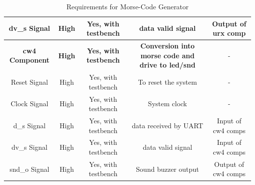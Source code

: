 \documentclass[12pt,a4paper, landscape]{article}
\begin{document}
\begin{table}[h!]
\begin{tabular}{|c||c|c|c|c|}
 \hline
 dv\_s Signal & High & Yes, with testbench & data valid signal & Output of urx comp \\ [0.5ex] 
 \hline
 \textbf{cw4 Component} & \textbf{High} & \textbf{Yes, with testbench} & \textbf{Conversion into morse code and drive to led/snd} & - \\[0.5ex] 
 \hline 
  Reset Signal & High & Yes, with testbench & To reset the system & -\\ [0.5ex] 
 \hline
 Clock Signal & High & Yes, with testbench & System clock & - \\ [0.5ex] 
 \hline
 d\_s Signal & High & Yes, with testbench & data received by UART & Input of cw4 comps \\ [0.5ex] 
 \hline
 dv\_s Signal & High & Yes, with testbench & data valid signal & Input of cw4 comps \\ [0.5ex] 
 \hline
 snd\_o Signal & High & Yes, with testbench & Sound buzzer output & Output of cw4 comps \\ [0.5ex] 
 \hline
 
\end{tabular}
\caption{ Requirements for Morse-Code Generator }
\label{table:1}
\end{table}
\end{document}
